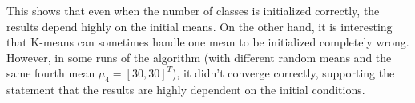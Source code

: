 \documentclass[DIV=12, ngerman, fontsize=12pt, parskip=half]{scrreprt}
\begin{document}
	This shows that even when the number of classes is initialized correctly, the results depend highly on the initial means. On the other hand, it is interesting that K-means can sometimes handle one mean to be initialized completely wrong. However, in some runs of the algorithm (with different random means and the same fourth mean $\mu_4 = [30,30]^T$), it didn't converge correctly, supporting the statement that the results are highly dependent on the initial conditions.
	
	
\end{document}
